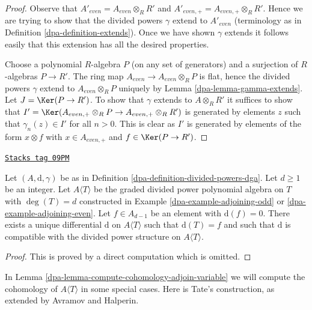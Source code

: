 \begin{proof}

Observe that $A'_{even} = A_{even} \otimes_R R'$ and
$A'_{even, +} = A_{even, +} \otimes_R R'$. Hence we are trying to
show that the divided powers $\gamma$ extend to $A'_{even}$
(terminology as in Definition \ref{dpa-definition-extends}).
Once we have shown $\gamma$ extends it follows easily that this
extension has all the desired properties.

\medskip\noindent
Choose a polynomial $R$-algebra $P$ (on any set of generators)
and a surjection of $R$-algebras
$P \to R'$. The ring map $A_{even} \to A_{even} \otimes_R P$ is flat,
hence the divided powers $\gamma$ extend to $A_{even} \otimes_R P$
uniquely by Lemma \ref{dpa-lemma-gamma-extends}.
Let $J = \Ker(P \to R')$. To show that $\gamma$ extends
to $A \otimes_R R'$ it suffices to show that
$I' = \Ker(A_{even, +} \otimes_R P \to A_{even, +} \otimes_R R')$
is generated by elements $z$ such that $\gamma_n(z) \in I'$
for all $n > 0$. This is clear as $I'$ is generated by elements
of the form $x \otimes f$ with
$x \in A_{even, +}$ and $f \in \Ker(P \to R')$.
\end{proof}

\begin{lemma}
\label{dpa-lemma-extend-differential}
\href{https://stacks.math.columbia.edu/tag/09PM}{\texttt{Stacks tag 09PM}}

Let $(A, \text{d}, \gamma)$ be as in
Definition \ref{dpa-definition-divided-powers-dga}.
Let $d \geq 1$ be an integer.
Let $A\langle T \rangle$ be the graded divided power polynomial algebra
on $T$ with $\deg(T) = d$
constructed in Example \ref{dpa-example-adjoining-odd} or
\ref{dpa-example-adjoining-even}.
Let $f \in A_{d - 1}$ be an element with $\text{d}(f) = 0$.
There exists a unique differential $\text{d}$
on $A\langle T\rangle$ such that $\text{d}(T) = f$ and
such that $\text{d}$ is compatible with the divided power
structure on $A\langle T \rangle$.
\end{lemma}

\begin{proof}
This is proved by a direct computation which is omitted.
\end{proof}

In Lemma \ref{dpa-lemma-compute-cohomology-adjoin-variable}
we will compute the cohomology of $A\langle T \rangle$ in some special cases.
Here is Tate's construction, as extended
by Avramov and Halperin.

